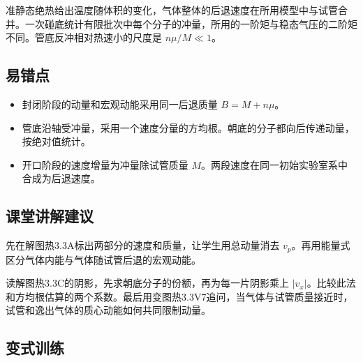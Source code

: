 \documentclass[UTF8,fontset=fandol,a4paper,11pt]{ctexart}
\begin{document}
准静态绝热给出温度随体积的变化，气体整体的后退速度在所用模型中与试管合并。一次碰底统计有限批次中每个分子的冲量，所用的一阶矩与稳态气压的二阶矩不同。管底反冲相对热速小的尺度是 $n\mu/M\ll1$。



\subsection*{易错点}

\begin{itemize}
\item 封闭阶段的动量和宏观动能采用同一后退质量 $B=M+n\mu$。
\item 管底沿轴受冲量，采用一个速度分量的方均根。朝底的分子都向后传递动量，按绝对值统计。
\item 开口阶段的速度增量为冲量除试管质量 $M$。两段速度在同一初始实验室系中合成为后退速度。
\end{itemize}



\subsection*{课堂讲解建议}

先在解图热3.3A标出两部分的速度和质量，让学生用总动量消去 $v_p$。再用能量式区分气体内能与气体随试管后退的宏观动能。

读解图热3.3C的阴影，先求朝底分子的份额，再为每一片阴影乘上 $|v_x|$。比较此法和方均根估算的两个系数。最后用变图热3.3V7追问，当气体与试管质量接近时，试管和逸出气体的质心动能如何共同限制动量。



\subsection*{变式训练}
\end{document}
